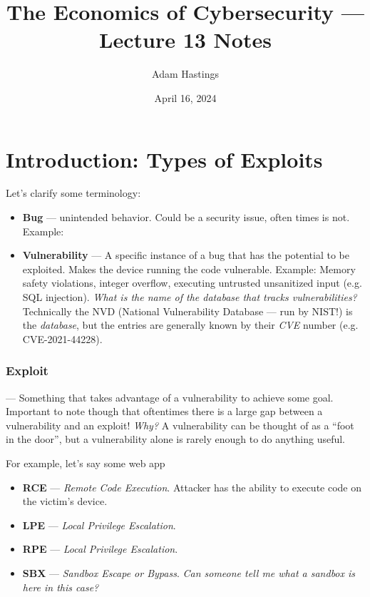 \documentclass[11pt]{article}
\title{The Economics of Cybersecurity --- Lecture 13 Notes}
\date{April 16, 2024}
\author{Adam Hastings}
\begin{document}
\maketitle


\section{Introduction: Types of Exploits}

Let's clarify some terminology:

\begin{itemize}
    \item {\bf Bug} --- unintended behavior. Could be a security issue, often times is not. Example: 
    \item {\bf Vulnerability} --- A specific instance of a bug that has the potential to be exploited. Makes the device running the code vulnerable. Example: Memory safety violations, integer overflow, executing untrusted unsanitized input (e.g. SQL injection). {\it What is the name of the database that tracks vulnerabilities?} Technically the NVD (National Vulnerability Database --- run by NIST!) is the {\it database}, but the entries are generally known by their {\it CVE} number (e.g. CVE-2021-44228). 
\end{itemize}

\subsubsection{Exploit} --- Something that takes advantage of a vulnerability to achieve some goal. Important to note though that oftentimes there is a large gap between a vulnerability and an exploit! 
{\it Why?} A vulnerability can be thought of as a ``foot in the door'', but a vulnerability alone is rarely enough to do anything useful.

For example, let's say some web app 

\begin{itemize}
    \item {\bf RCE} --- {\it Remote Code Execution}. Attacker has the ability to execute code on the victim's device. 
    \item {\bf LPE} --- {\it Local Privilege Escalation}. 
    \item {\bf RPE} --- {\it Local Privilege Escalation}.

    \item {\bf SBX} --- {\it Sandbox Escape or Bypass}. {\it Can someone tell me what a sandbox is here in this case? }
\end{itemize}
\end{document}
